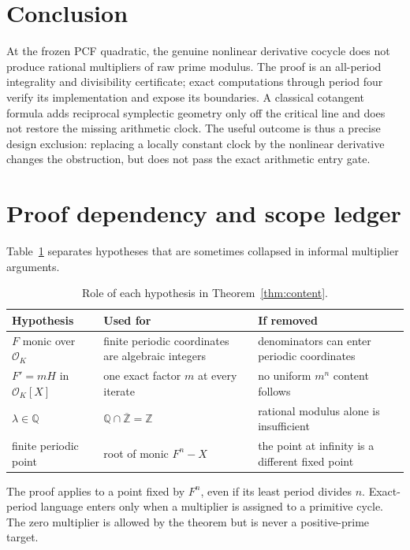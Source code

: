\documentclass[11pt]{article}
\theoremstyle{remark}
\newcommand{\Zbar}{\overline{\mathbb Z}}
\begin{document}
\section{Conclusion}

At the frozen PCF quadratic, the genuine nonlinear derivative cocycle does not
produce rational multipliers of raw prime modulus.  The proof is an all-period
integrality and divisibility certificate; exact computations through period
four verify its implementation and expose its boundaries.  A classical
cotangent formula adds reciprocal symplectic geometry only off the critical
line and does not restore the missing arithmetic clock.  The useful outcome
is thus a precise design exclusion: replacing a locally constant clock by the
nonlinear derivative changes the obstruction, but does not pass the exact
arithmetic entry gate.

\appendix

\section{Proof dependency and scope ledger}
\label{app:proof-ledger}

Table~\ref{tab:proof-scope} separates hypotheses that are sometimes collapsed
in informal multiplier arguments.

\begin{table}[H]
\centering
\caption{Role of each hypothesis in Theorem~\ref{thm:content}.}
\label{tab:proof-scope}
\begin{tabular}{@{}p{}p{}p{}@{}}
\toprule
Hypothesis & Used for & If removed \\
\midrule
\(F\) monic over \(\mathcal O_K\) & finite periodic coordinates are algebraic
integers & denominators can enter periodic coordinates \\
\(F'=mH\) in \(\mathcal O_K[X]\) & one exact factor \(m\) at every iterate &
no uniform \(m^n\) content follows \\
\(\lambda\in\mathbb Q\) &
\(\mathbb Q\cap\Zbar=\mathbb Z\) & rational modulus alone is insufficient \\
finite periodic point & root of monic \(F^n-X\) & the point at infinity is a
different fixed point \\
\bottomrule
\end{tabular}
\end{table}

The proof applies to a point fixed by \(F^n\), even if its least period divides
\(n\).  Exact-period language enters only when a multiplier is assigned to a
primitive cycle.  The zero multiplier is allowed by the theorem but is never
a positive-prime target.
\end{document}
